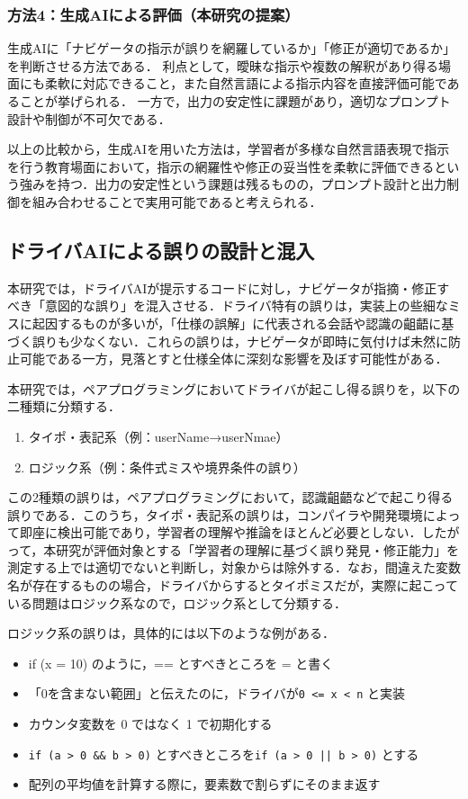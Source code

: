 \documentclass[twoside,twocolumn,10pt]{jsarticle}
\begin{document}
\subsubsection*{方法4：生成AIによる評価（本研究の提案）}
生成AIに「ナビゲータの指示が誤りを網羅しているか」「修正が適切であるか」を判断させる方法である．  
利点として，曖昧な指示や複数の解釈があり得る場面にも柔軟に対応できること，また自然言語による指示内容を直接評価可能であることが挙げられる．  
一方で，出力の安定性に課題があり，適切なプロンプト設計や制御が不可欠である．

以上の比較から，生成AIを用いた方法は，学習者が多様な自然言語表現で指示を行う教育場面において，指示の網羅性や修正の妥当性を柔軟に評価できるという強みを持つ．出力の安定性という課題は残るものの，プロンプト設計と出力制御を組み合わせることで実用可能であると考えられる．

\subsection{ドライバAIによる誤りの設計と混入}
本研究では，ドライバAIが提示するコードに対し，ナビゲータが指摘・修正すべき「意図的な誤り」を混入させる．ドライバ特有の誤りは，実装上の些細なミスに起因するものが多いが，「仕様の誤解」に代表される会話や認識の齟齬に基づく誤りも少なくない．これらの誤りは，ナビゲータが即時に気付けば未然に防止可能である一方，見落とすと仕様全体に深刻な影響を及ぼす可能性がある．

本研究では，ペアプログラミングにおいてドライバが起こし得る誤りを，以下の二種類に分類する．

\begin{enumerate}
    \item タイポ・表記系（例：userName→userNmae）
    \item ロジック系（例：条件式ミスや境界条件の誤り）
\end{enumerate}

この2種類の誤りは，ペアプログラミングにおいて，認識齟齬などで起こり得る誤りである．このうち，タイポ・表記系の誤りは，コンパイラや開発環境によって即座に検出可能であり，学習者の理解や推論をほとんど必要としない．したがって，本研究が評価対象とする「学習者の理解に基づく誤り発見・修正能力」を測定する上では適切でないと判断し，対象からは除外する．なお，間違えた変数名が存在するものの場合，ドライバからするとタイポミスだが，実際に起こっている問題はロジック系なので，ロジック系として分類する．

ロジック系の誤りは，具体的には以下のような例がある．

\begin{itemize}
        \item if (x = 10) のように，== とすべきところを = と書く
        \item 「0を含まない範囲」と伝えたのに，ドライバが\texttt{0 <= x < n} と実装
        \item カウンタ変数を 0 ではなく 1 で初期化する
        \item \texttt{if (a > 0 \&\& b > 0)} とすべきところを\texttt{if (a > 0 || b > 0)} とする
        \item 配列の平均値を計算する際に，要素数で割らずにそのまま返す
\end{itemize}
\end{document}
